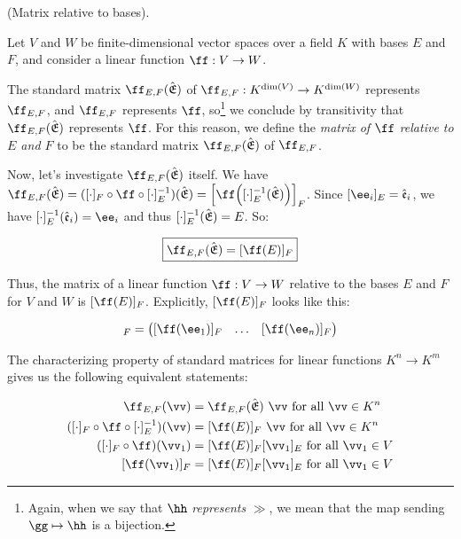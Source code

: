 \begin{deriv}
\label{ch::lin_alg::deriv::matrix_relative_to_bases}
    (Matrix relative to bases).
    
    Let $V$ and $W$ be finite-dimensional vector spaces over a field $K$ with bases $E$ and $F$, and consider a linear function $\ff:V \rightarrow W$. 
    
    The standard matrix $\ff_{E,F}(\sE)$ of $\ff_{E,F}:K^{\dim(V)} \rightarrow K^{\dim(W)}$ represents $\ff_{E,F}$, and $\ff_{E,F}$ represents $\ff$, so\footnote{Again, when we say that $\hh$ \textit{represents} $\gg$, we mean that the map sending $\gg \mapsto \hh$ is a bijection.} we conclude by transitivity that $\ff_{E,F}(\sE)$ represents $\ff$. For this reason, we define the \textit{matrix of $\ff$ relative to $E$ and $F$} to be the standard matrix $\ff_{E,F}(\sE)$ of $\ff_{E,F}$.
    
    
    Now, let's investigate $\ff_{E,F}(\sE)$ itself. We have $\ff_{E,F}(\sE) = ([\cdot]_F \circ \ff \circ [\cdot]_E^{-1})(\sE) = \Big[\ff\Big([\cdot]_E^{-1}(\sE)\Big)\Big]_F$. Since $[\ee_i]_E = \see_i$, we have $[\cdot]^{-1}_E(\see_i) = \ee_i$ and thus $[\cdot]_E^{-1}({\hat{\mathfrak{E}}}) = E$. So: 
    
    \begin{align*}
        \boxed
        {
            \ff_{E,F}(\sE) = [\ff(E)]_F
        }
    \end{align*}
    
    Thus, the matrix of a linear function $\ff:V \rightarrow W$ relative to the bases $E$ and $F$ for $V$ and $W$ is $[\ff(E)]_F$. Explicitly, $[\ff(E)]_F$ looks like this:
    
    \begin{align*}
        [\ff(E)]_F =
        \begin{pmatrix}
            [\ff(\ee_1)]_F & \hdots & [\ff(\ee_n)]_F
        \end{pmatrix}
    \end{align*}
    
    The characterizing property of standard matrices for linear functions $K^n \rightarrow K^m$ gives us the following equivalent statements:
    
    \begin{align*}
        \ff_{E,F}(\vv) &= \ff_{E,F}(\sE) \spc \vv \text{ for all $\vv \in K^n$} \\
        ([\cdot]_F \circ \ff \circ [\cdot]_E^{-1})(\vv) &= [\ff(E)]_F \spc \vv \text{ for all $\vv \in K^n$} \\
        ([\cdot]_F \circ \ff)(\vv_1) &= [\ff(E)]_F [\vv_1]_E \text{ for all $\vv_1 \in V$} \\
        [\ff(\vv_1)]_F &= [\ff(E)]_F [\vv_1]_E \text{ for all $\vv_1 \in V$}
    \end{align*}
    

\end{deriv}
